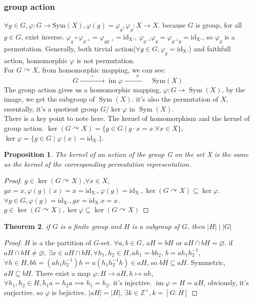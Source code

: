\documentclass[10pt,a4paper]{article}
\newtheorem{theorem}{Theorem}[section]
\newtheorem{proposition}[theorem]{Proposition}
\begin{document}
\subsubsection{group action}
$\forall g\in G,\varphi:G\to\mathrm{Sym}(X),\varphi(g)=\varphi_g,\varphi_g:X\to X$.
because $G$ is group, for all $g\in G$, exist inverse. $\varphi_g\circ\varphi_{g^{-1}}=\varphi_{gg^{-1}}=\mathrm{id_X.}$,
$\varphi_{g^{-1}}\varphi_g=\varphi_{g^{-1}g}=\mathrm{id_X.}$, so $\varphi_g$ is a permutation. Generally, both tirvial action($\forall g\in G,\varphi_g=\mathrm{id_X.}$) 
and faithfull action, homomorphic $\varphi$ is not permutation. \\
For $G\curvearrowright X$, from homomorphic mapping, we can see:
\[G \xrightarrow{\hspace{1cm}\iota\hspace{1cm}}
\operatorname{im}\varphi
\xrightarrow{\hspace{1cm}\pi\hspace{1cm}}
\mathrm{Sym}(X)\]
The group action gives us a homomorphic mapping, $\varphi:G\to\operatorname{Sym}(X)$, by the image, we get the subgroup of $\operatorname{Sym}(X)$.
it's also the permutation of $X$, essentally, it's a quotient group $G/\ker\varphi$ in $\operatorname{Sym}(X)$.\\
There is a key point to note here. The kernel of homomorphism and the kernel of group action.
$\ker(G\curvearrowright X)=\{g\in G\mid g\cdot x=x.\forall x\in X\}$, $\ker\varphi=\{g\in G\mid\varphi(x)=\mathrm{id_X.}\}$.
\begin{proposition}
   The kernel of an action of the group G on the set X is the same as the kernel of the corresponding permutation representation.
\end{proposition}
\begin{proof}
$g\in\ker(G\curvearrowright X)$,$\forall x\in X$,$gx=x,\varphi(g)(x)=x=\mathrm{id_X.},\varphi(g)=\mathrm{id_X.},\ker(G\curvearrowright X)\subseteq\ker\varphi$.
$\forall g\in G,\varphi(g)=\mathrm{id_X.},gx=\mathrm{id_X.}x=x.$
$g\in\ker(G\curvearrowright X),\ker\varphi\subseteq\ker(G\curvearrowright X)$ 
\end{proof}
\begin{theorem}
    if $G$ is a finite group and $H$ is a subgroup of $G$, then $|H|\mid|G|$
\end{theorem}
\begin{proof}
    $H$ is a the partition of $G$-set. $\forall a,b\in G$, $aH=bH$ or $aH\cap bH=\varnothing$. if $aH\cap bH\ne\varnothing$, $\exists x\in aH\cap bH,\forall h_1,h_2\in H,ah_1=bh_2$,
    $b=ah_1h_2^{-1}$, $\forall h\in H,bh=(ah_1h_2^{-1})h=a(h_1h_2^{-1}h)\in aH$, so $bH\subseteq aH$. Symmetric, $aH\subseteq bH$.
    There exist a map $\varphi:H\to aH,h\mapsto ah$, $\forall h_1,h_2\in H,h_1a=h_2a\implies h_1=h_2$. it's injective. $\operatorname{im}\varphi=H=aH$, obviously, it's surjective.
    so $\varphi$ is bejictive. $|aH|=|H|$, $\exists k\in\mathbb{Z}^+,k=[G:H]$ 
\end{proof}
\end{document}
